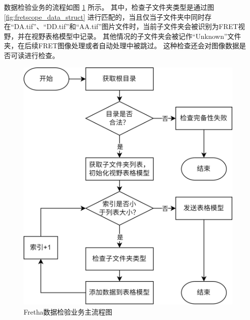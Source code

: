 数据检验业务的流程如图 \ref{fig:fretha_data_check_flow} 所示。
其中，检查子文件夹类型是通过图 \ref{fig:fretscope_data_struct} 进行匹配的，当且仅当子文件夹中同时存在“DA.tif”、“DD.tif”和“AA.tif”图片文件时，当前子文件夹会被识别为FRET视野，并在视野表格模型中记录。
其他情况的子文件夹会被记作“Unknown”文件夹，在后续FRET图像处理或者自动处理中被跳过。
这种检查还会对图像数据是否可读进行检查。
\begin{figure}[htbp]
    \centering
    \includegraphics[width=0.65\linewidth]{../figures/2/2_数据完备性检验业务.drawio.png}
    \caption{Fretha数据检验业务主流程图}
    \label{fig:fretha_data_check_flow}
\end{figure}

